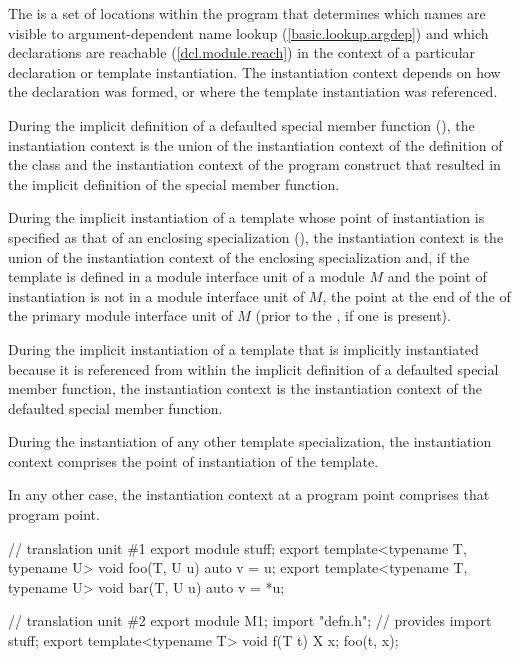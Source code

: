\begin{std.txt}\color{addclr}
\resetalinea[0]
\alinea
The  is a set of locations within the program
that determines which names are visible to argument-dependent name lookup
(\ref{basic.lookup.argdep})
and which declarations are reachable (\ref{dcl.module.reach})
in the context of a particular declaration or template instantiation.
The instantiation context depends on how the declaration was formed,
or where the template instantiation was referenced.

\alinea
During the implicit definition of a defaulted special member function
(),
the instantiation context is the union of
the instantiation context of the definition of the class and
the instantiation context of the program construct that
resulted in the implicit definition of the special member function.

\alinea
During the implicit instantiation of a template
whose point of instantiation is specified as
that of an enclosing specialization (),
the instantiation context is the union of
the instantiation context of the enclosing specialization and,
if the template is defined in a module interface unit of a module $M$
and the point of instantiation is not in a module interface unit of $M$,
the point at the end of the
 of the
primary module interface unit of $M$
(prior to the ,
if one is present).

\alinea
During the implicit instantiation of a template
that is implicitly instantiated because it is referenced
from within the implicit definition of a defaulted special member function,
the instantiation context is the instantiation context of
the defaulted special member function.

\alinea
During the instantiation of any other template specialization,
the instantiation context comprises the point of instantiation
of the template.

\alinea
In any other case, the instantiation context at a program point comprises
that program point.

\alinea
\begin{example}
\begin{codeblock}
// translation unit \#1
export module stuff;
export template<typename T, typename U> void foo(T, U u) { auto v = u; }
export template<typename T, typename U> void bar(T, U u) { auto v = *u; }

// translation unit \#2
export module M1;
import "defn.h";        // provides 
import stuff;
export template<typename T> void f(T t) {
 X x;
 foo(t, x);
}


\end{codeblock}
\end{example}
\end{std.txt}
